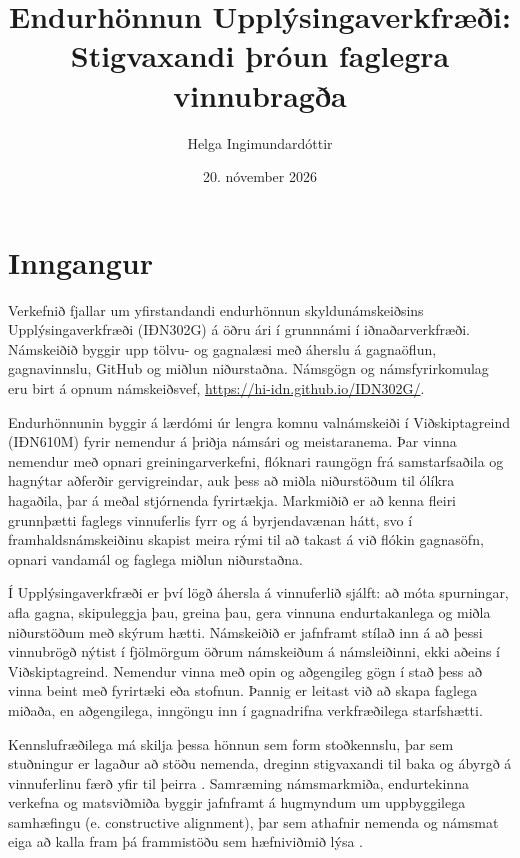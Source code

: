 \documentclass{kennsluakademia_conf}
\date{20. nóvember 2026}
\title{Endurhönnun Upplýsingaverkfræði: Stigvaxandi þróun faglegra
vinnubragða}
\author{%
Helga Ingimundardóttir\autid{}{0000-0002-2780-3546}%
}
\affil{}{Iðnaðarverkfræði-, vélaverkfræði- og tölvunarfræðideild
(IVT), Háskóli Íslands}
\begin{document}
\maketitle


\section{Inngangur}\label{inngangur}

Verkefnið fjallar um yfirstandandi endurhönnun skyldunámskeiðsins
Upplýsingaverkfræði (IÐN302G) á öðru ári í grunnnámi í iðnaðarverkfræði.
Námskeiðið byggir upp tölvu- og gagnalæsi með áherslu á gagnaöflun,
gagnavinnslu, GitHub og miðlun niðurstaðna. Námsgögn og námsfyrirkomulag
eru birt á opnum námskeiðsvef, \url{https://hi-idn.github.io/IDN302G/}.

Endurhönnunin byggir á lærdómi úr lengra komnu valnámskeiði í
Viðskiptagreind (IÐN610M) fyrir nemendur á þriðja námsári og
meistaranema. Þar vinna nemendur með opnari greiningarverkefni, flóknari
raungögn frá samstarfsaðila og hagnýtar aðferðir gervigreindar, auk þess
að miðla niðurstöðum til ólíkra hagaðila, þar á meðal stjórnenda
fyrirtækja. Markmiðið er að kenna fleiri grunnþætti faglegs vinnuferlis
fyrr og á byrjendavænan hátt, svo í framhaldsnámskeiðinu skapist meira
rými til að takast á við flókin gagnasöfn, opnari vandamál og faglega
miðlun niðurstaðna.

Í Upplýsingaverkfræði er því lögð áhersla á vinnuferlið sjálft: að móta
spurningar, afla gagna, skipuleggja þau, greina þau, gera vinnuna
endurtakanlega og miðla niðurstöðum með skýrum hætti. Námskeiðið er
jafnframt stílað inn á að þessi vinnubrögð nýtist í fjölmörgum öðrum
námskeiðum á námsleiðinni, ekki aðeins í Viðskiptagreind. Nemendur vinna
með opin og aðgengileg gögn í stað þess að vinna beint með fyrirtæki eða
stofnun. Þannig er leitast við að skapa faglega miðaða, en aðgengilega,
inngöngu inn í gagnadrifna verkfræðilega starfshætti.

Kennslufræðilega má skilja þessa hönnun sem form stoðkennslu, þar sem
stuðningur er lagaður að stöðu nemenda, dreginn stigvaxandi til baka og
ábyrgð á vinnuferlinu færð yfir til þeirra
\citep{VanDePolVolmanBeishuizen2010Scaffolding}. Samræming námsmarkmiða,
endurtekinna verkefna og matsviðmiða byggir jafnframt á hugmyndum um
uppbyggilega samhæfingu (e. constructive alignment), þar sem athafnir
nemenda og námsmat eiga að kalla fram þá frammistöðu sem hæfniviðmið
lýsa \citep{Biggs1996ConstructiveAlignment}.

\end{document}

